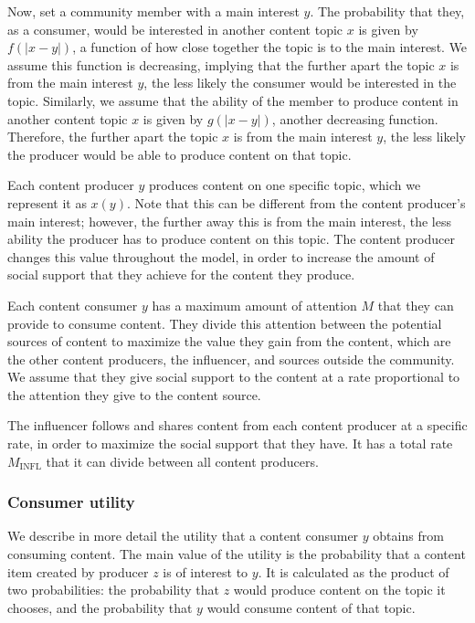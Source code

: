 \documentclass[11pt, letterpaper]{article}
\begin{document}
Now, set a community member with a main interest \(y\). The probability that they, as a consumer, would be interested in another content topic \(x\) is given by \(f(|x-y|)\), a function of how close together the topic is to the main interest. We assume this function is decreasing, implying that the further apart the topic \(x\) is from the main interest \(y\), the less likely the consumer would be interested in the topic. Similarly, we assume that the ability of the member to produce content in another content topic \(x\) is given by \(g(|x-y|)\), another decreasing function. Therefore, the further apart the topic \(x\) is from the main interest \(y\), the less likely the producer would be able to produce content on that topic.

Each content producer \(y\) produces content on one specific topic, which we represent it as \(x(y)\). Note that this can be different from the content producer's main interest; however, the further away this is from the main interest, the less ability the producer has to produce content on this topic. The content producer changes this value throughout the model, in order to increase the amount of social support that they achieve for the content they produce. 

Each content consumer \(y\) has a maximum amount of attention \(M\) that they can provide to consume content. They divide this attention between the potential sources of content to maximize the value they gain from the content, which are the other content producers, the influencer, and sources outside the community. We assume that they give social support to the content at a rate proportional to the attention they give to the content source. 

The influencer follows and shares content from each content producer at a specific rate, in order to maximize the social support that they have. It has a total rate \(M_\text{INFL}\) that it can divide between all content producers.

\subsubsection{Consumer utility}

We describe in more detail the utility that a content consumer \(y\) obtains from consuming content. The main value of the utility is the probability that a content item created by producer \(z\) is of interest to \(y\). It is calculated as the product of two probabilities: the probability that \(z\) would produce content on the topic it chooses, and the probability that \(y\) would consume content of that topic.
\end{document}
